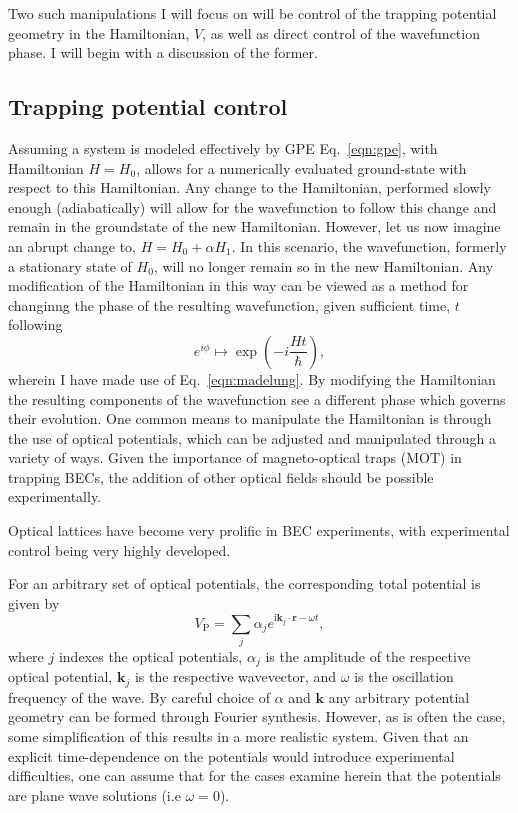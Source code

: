 Two such manipulations I will focus on will be control of the trapping potential geometry in the Hamiltonian, $V$, as well as direct control of the wavefunction phase. I will begin with a discussion of the former.

\subsection{Trapping potential control}

Assuming a system is modeled effectively by GPE Eq.~\ref{eqn:gpe}, with Hamiltonian $H = H_0$, allows for a numerically evaluated ground-state with respect to this Hamiltonian. Any change to the Hamiltonian, performed slowly enough (adiabatically) will allow for the wavefunction to follow this change and remain in the groundstate of the new Hamiltonian. However, let us now imagine an abrupt change to, $H = H_0 + \alpha H_1$. In this scenario, the wavefunction, formerly a stationary state of $H_0$, will no longer remain so in the new Hamiltonian. Any modification of the Hamiltonian in this way can be viewed as a method for changinng the phase of the resulting wavefunction, given sufficient time, $t$ following
\begin{equation}
    e^{i\phi} \mapsto \exp\left(-i\frac{Ht}{\hbar}\right),
\end{equation}
wherein I have made use of Eq.~\ref{eqn:madelung}. By modifying the Hamiltonian the resulting components of the wavefunction see a different phase which governs their evolution. One common means to manipulate the Hamiltonian is through the use of optical potentials, which can be adjusted and manipulated through a variety of ways. Given the importance of magneto-optical traps (MOT) in trapping BECs, the addition of other optical fields should be possible experimentally.

Optical lattices have become very prolific in BEC experiments, with experimental control being very highly developed.

For an arbitrary set of optical potentials, the corresponding total potential is given by
\begin{equation}\label{eqn:vopt}
    V_{\textrm{P}} = \displaystyle\sum\limits_{j} \alpha_j e^{\textrm{i}\mathbf{k}_j\cdot\mathbf{r} - \omega t},
\end{equation}
where $j$ indexes the optical potentials, $\alpha_j$ is the amplitude of the respective optical potential, $\mathbf{k}_j$ is the respective wavevector, and $\omega$ is the oscillation frequency of the wave. By careful choice of $\alpha$ and $\mathbf{k}$ any arbitrary potential geometry can be formed through Fourier synthesis. However, as is often the case, some simplification of this results in a more realistic system. Given that an explicit time-dependence on the potentials would introduce experimental difficulties, one can assume that for the cases examine herein that the potentials are plane wave solutions (i.e $\omega=0$).




